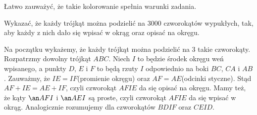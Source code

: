 \noindent
Łatwo zauważyć, że takie kolorowanie spełnia warunki zadania.

\begin{problem}{3}
	Wykazać, że każdy trójkąt można podzielić na $3000$ czworokątów wypukłych, tak, aby każdy z nich dało się wpisać w okrąg oraz opisać na okręgu.
\end{problem}

\noindent
Na początku wykażemy, że każdy trójkąt można podzielić na $3$ takie czworokąty. Rozpatrzmy dowolny trójkąt $ABC$. Niech $I$ to będzie środek okręgu weń wpisanego, a punkty $D$, $E$ i $F$ to będą rzuty $I$ odpowiednio na boki $BC$, $CA$ i $AB$. Zauważmy, że $IE = IF$(promienie okręgu) oraz $AF = AE$(odcinki styczne). Stąd $AF + IE = AE + IF$, czyli czworokąt $AFIE$ da się opisać na okręgu. Mamy też, że kąty $\an AFI$ i $\an AEI$ są proste, czyli czworokąt $AFIE$ da się wpisać w okrąg. Analogicznie rozumujemy dla czworokątów $BDIF$ oraz $CEID$.

\begin{center}
	\hspace{10px}
\end{center}

